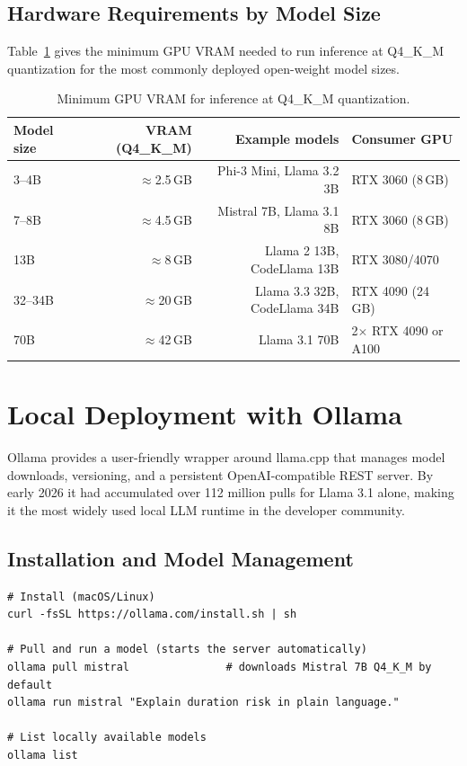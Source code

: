 \subsection{Hardware Requirements by Model Size}
\label{app:hf:hardware}

Table~\ref{tab:hardware-reqs} gives the minimum GPU VRAM needed to run
inference at Q4\_K\_M quantization for the most commonly deployed open-weight
model sizes.

\begin{table}[ht]
\centering
\caption{Minimum GPU VRAM for inference at Q4\_K\_M quantization.}
\label{tab:hardware-reqs}
\begin{tabular}{lrrl}
\toprule
\textbf{Model size} & \textbf{VRAM (Q4\_K\_M)} & \textbf{Example models} & \textbf{Consumer GPU} \\
\midrule
3--4B   & $\approx$2.5\,GB & Phi-3 Mini, Llama 3.2 3B & RTX 3060 (8\,GB) \\
7--8B   & $\approx$4.5\,GB & Mistral 7B, Llama 3.1 8B & RTX 3060 (8\,GB) \\
13B     & $\approx$8\,GB   & Llama 2 13B, CodeLlama 13B & RTX 3080/4070 \\
32--34B & $\approx$20\,GB  & Llama 3.3 32B, CodeLlama 34B & RTX 4090 (24\,GB) \\
70B     & $\approx$42\,GB  & Llama 3.1 70B              & 2$\times$ RTX 4090 or A100 \\
\bottomrule
\end{tabular}
\end{table}

\section{Local Deployment with Ollama}
\label{app:hf:ollama}

Ollama provides a user-friendly wrapper around llama.cpp that manages model
downloads, versioning, and a persistent OpenAI-compatible REST server.  By
early 2026 it had accumulated over 112 million pulls for Llama 3.1 alone,
making it the most widely used local LLM runtime in the developer community.

\subsection{Installation and Model Management}
\label{app:hf:ollama-install}

\begin{verbatim}
# Install (macOS/Linux)
curl -fsSL https://ollama.com/install.sh | sh

# Pull and run a model (starts the server automatically)
ollama pull mistral               # downloads Mistral 7B Q4_K_M by default
ollama run mistral "Explain duration risk in plain language."

# List locally available models
ollama list
\end{verbatim}

